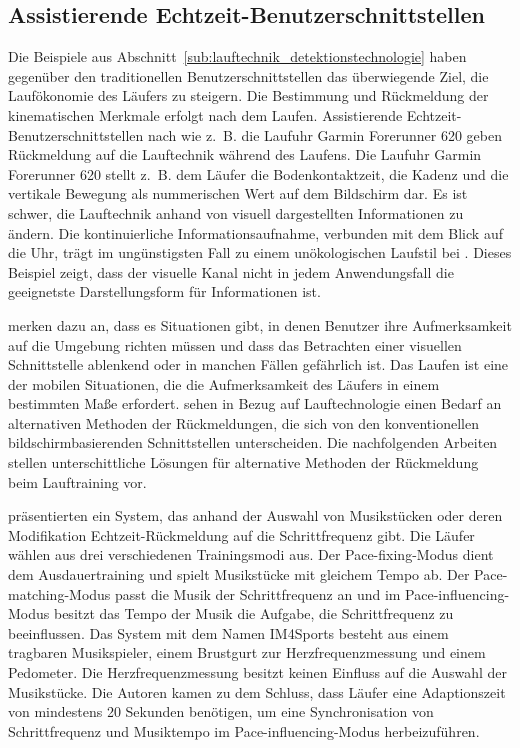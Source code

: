 \subsection{Assistierende Echtzeit-Benutzerschnittstellen} 

\label{sub:assistierende_echtzeit_benutzerschnittstellen}

Die Beispiele aus Abschnitt~\ref{sub:lauftechnik_detektionstechnologie} haben gegenüber den traditionellen Benutzerschnittstellen das überwiegende Ziel, die Laufökonomie des Läufers zu steigern. Die Bestimmung und Rückmeldung der kinematischen Merkmale erfolgt nach dem Laufen. Assistierende Echtzeit-Benutzerschnittstellen nach \citet{Jensen2014} wie z.~B. die Laufuhr Garmin Forerunner 620 geben Rückmeldung auf die Lauftechnik während des Laufens. Die Laufuhr Garmin Forerunner 620 stellt z.~B. dem Läufer die Bodenkontaktzeit, die Kadenz und die vertikale Bewegung als nummerischen Wert auf dem Bildschirm dar. Es ist schwer, die Lauftechnik anhand von visuell dargestellten Informationen zu ändern. Die kontinuierliche Informationsaufnahme, verbunden mit dem Blick auf die Uhr, trägt im ungünstigsten Fall zu einem unökologischen Laufstil bei \citep{Jensen2014}. Dieses Beispiel zeigt, dass der visuelle Kanal nicht in jedem Anwendungsfall die geeignetste Darstellungsform für Informationen ist. 

\citet{Zhao2007} merken dazu an, dass es Situationen gibt, in denen Benutzer ihre Aufmerksamkeit auf die Umgebung richten müssen und dass das Betrachten einer visuellen Schnittstelle ablenkend oder in manchen Fällen gefährlich ist. Das Laufen ist eine der mobilen Situationen, die die Aufmerksamkeit des Läufers in einem bestimmten Maße erfordert. \citet{Jensen2014} sehen in Bezug auf Lauftechnologie einen Bedarf an alternativen Methoden der Rückmeldungen, die sich von den konventionellen bildschirmbasierenden Schnittstellen unterscheiden. Die nachfolgenden Arbeiten stellen unterschittliche Lösungen für alternative Methoden der Rückmeldung beim Lauftraining vor. 

\citet{Wijnalda2005} präsentierten ein System, das anhand der Auswahl von Musikstücken oder deren Modifikation Echtzeit-Rückmeldung auf die Schrittfrequenz gibt. Die Läufer wählen aus drei verschiedenen Trainingsmodi aus. Der Pace-fixing-Modus dient dem Ausdauertraining und spielt Musikstücke mit gleichem Tempo ab. Der Pace-matching-Modus passt die Musik der Schrittfrequenz an und im Pace-influencing-Modus besitzt das Tempo der Musik die Aufgabe, die Schrittfrequenz zu beeinflussen. Das System mit dem Namen IM4Sports besteht aus einem tragbaren Musikspieler, einem Brustgurt zur Herzfrequenzmessung und einem Pedometer. Die Herzfrequenzmessung besitzt keinen Einfluss auf die Auswahl der Musikstücke. Die Autoren kamen zu dem Schluss, dass Läufer eine Adaptionszeit von mindestens 20 Sekunden benötigen, um eine Synchronisation von Schrittfrequenz und Musiktempo im Pace-influencing-Modus herbeizuführen.

